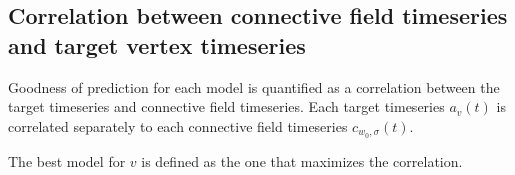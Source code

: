 \documentclass[biblatex]{lni}
\begin{document}
\subsection{Correlation between connective field timeseries and target vertex timeseries}

Goodness of prediction for each model is quantified as a correlation between the target timeseries and connective field timeseries. Each target timeseries $a_v(t)$ is correlated separately to each connective field timeseries $c_{w_0,\sigma}(t)$. 

The best model for $v$ is defined as the one that maximizes the correlation.






\printbibliography
\end{document}
